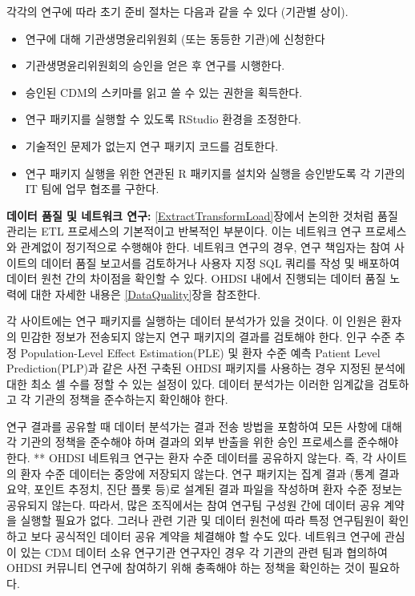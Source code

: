 \documentclass[10.5pt]{book}
\providecommand{\tightlist}{%
  \setlength{\itemsep}{0pt}\setlength{\parskip}{0pt}}
\theoremstyle{definition}
\theoremstyle{definition}
\theoremstyle{definition}
\theoremstyle{remark}
\let\BeginKnitrBlock\begin \let\EndKnitrBlock\end
\begin{document}
각각의 연구에 따라 초기 준비 절차는 다음과 같을 수 있다 (기관별 상이).

\begin{itemize}
\tightlist
\item
  연구에 대해 기관생명윤리위원회 (또는 동등한 기관)에 신청한다
\item
  기관생명윤리위원회의 승인을 얻은 후 연구를 시행한다.
\item
  승인된 CDM의 스키마를 읽고 쓸 수 있는 권한을 획득한다.
\item
  연구 패키지를 실행할 수 있도록 RStudio 환경을 조정한다.
\item
  기술적인 문제가 없는지 연구 패키지 코드를 검토한다.
\item
  연구 패키지 실행을 위한 연관된 R 패키지를 설치와 실행을 승인받도록 각
  기관의 IT 팀에 업무 협조를 구한다.
\end{itemize}

\BeginKnitrBlock{rmdimportant}
\textbf{데이터 품질 및 네트워크 연구:} \ref{ExtractTransformLoad}장에서
논의한 것처럼 품질 관리는 ETL 프로세스의 기본적이고 반복적인 부분이다.
이는 네트워크 연구 프로세스와 관계없이 정기적으로 수행해야 한다.
네트워크 연구의 경우, 연구 책임자는 참여 사이트의 데이터 품질 보고서를
검토하거나 사용자 지정 SQL 쿼리를 작성 및 배포하여 데이터 원천 간의
차이점을 확인할 수 있다. OHDSI 내에서 진행되는 데이터 품질 노력에 대한
자세한 내용은 \ref{DataQuality}장을 참조한다.
\EndKnitrBlock{rmdimportant}

각 사이트에는 연구 패키지를 실행하는 데이터 분석가가 있을 것이다. 이
인원은 환자의 민감한 정보가 전송되지 않는지 연구 패키지의 결과를
검토해야 한다. 인구 수준 추정 Population-Level Effect Estimation(PLE) 및
환자 수준 예측 Patient Level Prediction(PLP)과 같은 사전 구축된 OHDSI
패키지를 사용하는 경우 지정된 분석에 대한 최소 셀 수를 정할 수 있는
설정이 있다. 데이터 분석가는 이러한 임계값을 검토하고 각 기관의 정책을
준수하는지 확인해야 한다.

연구 결과를 공유할 때 데이터 분석가는 결과 전송 방법을 포함하여 모든
사항에 대해 각 기관의 정책을 준수해야 하며 결과의 외부 반출을 위한 승인
프로세스를 준수해야 한다. ** OHDSI 네트워크 연구는 환자 수준 데이터를
공유하지 않는다. 즉, 각 사이트의 환자 수준 데이터는 중앙에 저장되지
않는다. 연구 패키지는 집계 결과 (통계 결과 요약, 포인트 추정치, 진단
플롯 등)로 설계된 결과 파일을 작성하며 환자 수준 정보는 공유되지 않는다.
따라서, 많은 조직에서는 참여 연구팀 구성원 간에 데이터 공유 계약을
실행할 필요가 없다. 그러나 관련 기관 및 데이터 원천에 따라 특정
연구팀원이 확인하고 보다 공식적인 데이터 공유 계약을 체결해야 할 수도
있다. 네트워크 연구에 관심이 있는 CDM 데이터 소유 연구기관 연구자인 경우
각 기관의 관련 팀과 협의하여 OHDSI 커뮤니티 연구에 참여하기 위해
충족해야 하는 정책을 확인하는 것이 필요하다.
\end{document}
